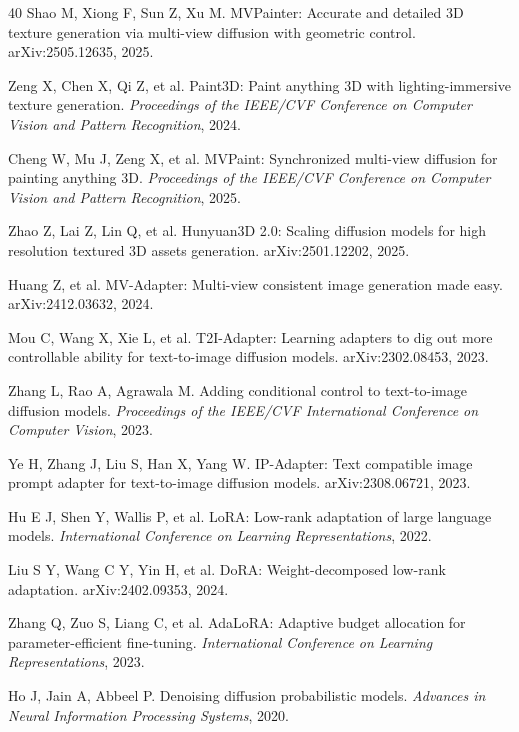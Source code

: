 \documentclass[times,twocolumn,final]{elsarticle}
\begin{document}
\begin{thebibliography}{40}
Shao M, Xiong F, Sun Z, Xu M. MVPainter: Accurate and detailed 3D texture generation via multi-view diffusion with geometric control. arXiv:2505.12635, 2025.

Zeng X, Chen X, Qi Z, et al. Paint3D: Paint anything 3D with lighting-immersive texture generation. \textit{Proceedings of the IEEE/CVF Conference on Computer Vision and Pattern Recognition}, 2024.

Cheng W, Mu J, Zeng X, et al. MVPaint: Synchronized multi-view diffusion for painting anything 3D. \textit{Proceedings of the IEEE/CVF Conference on Computer Vision and Pattern Recognition}, 2025.

Zhao Z, Lai Z, Lin Q, et al. Hunyuan3D 2.0: Scaling diffusion models for high resolution textured 3D assets generation. arXiv:2501.12202, 2025.

Huang Z, et al. MV-Adapter: Multi-view consistent image generation made easy. arXiv:2412.03632, 2024.

Mou C, Wang X, Xie L, et al. T2I-Adapter: Learning adapters to dig out more controllable ability for text-to-image diffusion models. arXiv:2302.08453, 2023.

Zhang L, Rao A, Agrawala M. Adding conditional control to text-to-image diffusion models. \textit{Proceedings of the IEEE/CVF International Conference on Computer Vision}, 2023.

Ye H, Zhang J, Liu S, Han X, Yang W. IP-Adapter: Text compatible image prompt adapter for text-to-image diffusion models. arXiv:2308.06721, 2023.

Hu E J, Shen Y, Wallis P, et al. LoRA: Low-rank adaptation of large language models. \textit{International Conference on Learning Representations}, 2022.

Liu S Y, Wang C Y, Yin H, et al. DoRA: Weight-decomposed low-rank adaptation. arXiv:2402.09353, 2024.

Zhang Q, Zuo S, Liang C, et al. AdaLoRA: Adaptive budget allocation for parameter-efficient fine-tuning. \textit{International Conference on Learning Representations}, 2023.

Ho J, Jain A, Abbeel P. Denoising diffusion probabilistic models. \textit{Advances in Neural Information Processing Systems}, 2020.


\end{thebibliography}
\end{document}
